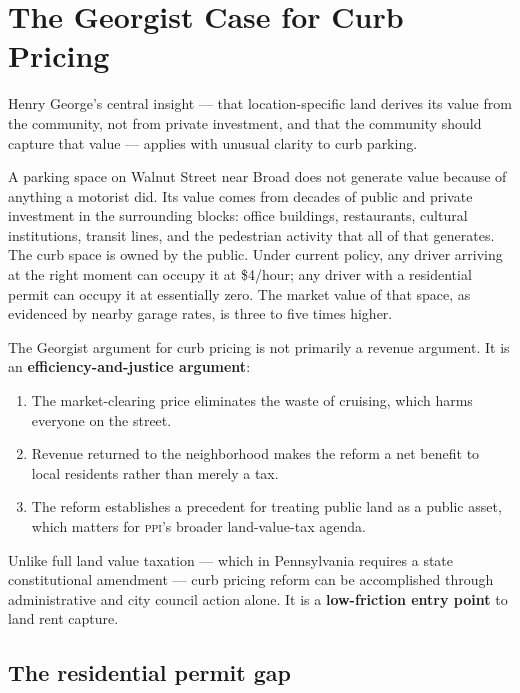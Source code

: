 \documentclass[11pt, letterpaper]{article}
\begin{document}
\clearpage

\section{The Georgist Case for Curb Pricing}

Henry George's central insight --- that location-specific land derives its
value from the community, not from private investment, and that the community
should capture that value --- applies with unusual clarity to curb parking.

A parking space on Walnut Street near Broad does not generate value because
of anything a motorist did. Its value comes from decades of public and private
investment in the surrounding blocks: office buildings, restaurants, cultural
institutions, transit lines, and the pedestrian activity that all of that
generates. The curb space is owned by the public. Under current policy, any
driver arriving at the right moment can occupy it at \$4/hour; any driver
with a residential permit can occupy it at essentially zero. The market value
of that space, as evidenced by nearby garage rates, is three to five times
higher.

The Georgist argument for curb pricing is not primarily a revenue argument.
It is an \textbf{efficiency-and-justice argument}:
\begin{enumerate}
  \item The market-clearing price eliminates the waste of cruising, which
        harms everyone on the street.
  \item Revenue returned to the neighborhood makes the reform a net benefit
        to local residents rather than merely a tax.
  \item The reform establishes a precedent for treating public land as a
        public asset, which matters for \textsc{ppi}'s broader
        land-value-tax agenda.
\end{enumerate}

Unlike full land value taxation --- which in Pennsylvania requires a state
constitutional amendment --- curb pricing reform can be accomplished through
administrative and city council action alone. It is a \textbf{low-friction
entry point} to land rent capture.

\subsection{The residential permit gap}
\end{document}
